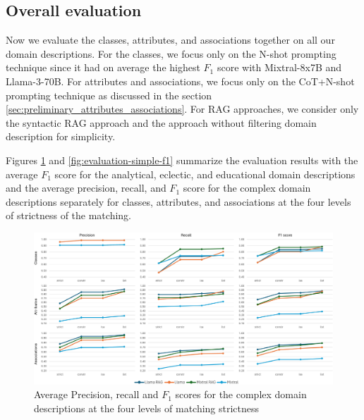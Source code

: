 \subsection{Overall evaluation}
\label{sec:overall_evaluation}

Now we evaluate the classes, attributes, and associations together on all our domain descriptions. For the classes, we focus only on the N-shot prompting technique since it had on average the highest $F_1$ score with Mixtral-8x7B and Llama-3-70B. For attributes and associations, we focus only on the CoT+N-shot prompting technique as discussed in the section \ref{sec:preliminary_attributes_associations}. For RAG approaches, we consider only the syntactic RAG approach and the approach without filtering domain description for simplicity.

Figures \ref{fig:evaluation-complex-p-r-f1} and \ref{fig:evaluation-simple-f1} summarize the evaluation results with the average $F_1$ score for the analytical, eclectic, and educational domain descriptions and the average precision, recall, and $F_1$ score for the complex domain descriptions separately for classes, attributes, and associations at the four levels of strictness of the matching.

\begin{figure}[!h]
    \centering
    \includegraphics[scale=0.10]{img/evaluation-complex-p-r-f1.png}
    \caption{\centering Average Precision, recall and $F_1$ scores for the complex domain descriptions at the four levels of matching strictness}
    \label{fig:evaluation-complex-p-r-f1}
\end{figure}

